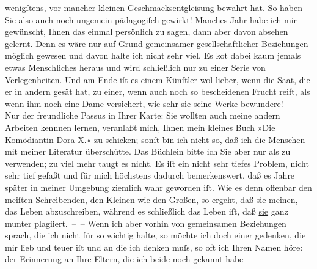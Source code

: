 \begin{ledgroupsized}[t]{13cm}
               wenigſtens, vor mancher kleinen Geschmacksentgleisung bewahrt hat. So haben Sie also
               auch noch ungemein pädagogiſch gewirkt!\pend
           \pstart
           {\pb}Manches Jahr habe ich mir gewünscht, Ihnen das einmal
               persönlich zu sagen, dann aber davon absehen gelernt. Denn es wäre nur auf Grund
               gemeinsamer gesellschaftlicher Beziehungen möglich gewesen und davon halte ich nicht
               sehr viel. Es ko{\geminationm}t dabei kaum jemals etwas Menschliches
               heraus und wird schließlich nur zu einer Serie von Verlegenheiten. Und am Ende iſt es
               einem Künſtler wol lieber, wenn die Saat, die er in andern gesät hat, zu einer, wenn
               auch noch so bescheidenen Frucht reift, als wenn ihm \uline{noch} eine Dame versichert, wie sehr sie seine Werke bewundere! – –\pend
           \pstart
           Nur der freundliche Passus in Ihrer Karte: Sie wollten auch meine andern Arbeiten
               kennnen lernen, veranlaßt mich, Ihnen mein kleines Buch »Die Komödiantin Dora X.« zu schicken; sonſt bin ich nicht so, daß ich die
               Menschen mit meiner Literatur überschütte. Das Büchlein bitte ich Sie\strikeout{,} aber nur als \label{K_L02572-1v}\label{K_L02572-1h} zu verwenden; zu viel mehr taugt es nicht. Es iſt ein nicht sehr tiefes
               Problem, nicht sehr tief gefaßt und für mich höchstens dadurch bemerkenswert, daß es
               Jahre später in meiner Umgebung ziemlich wahr geworden iſt. Wie es denn offenbar den
               meiſten Schreibenden, den Kleinen wie den Großen, so ergeht, {\pb}daß sie meinen, das Leben abzuschreiben, während es schließlich das Leben iſt, daß
                  \uline{sie} ganz munter plagiiert. – –\pend
           \pstart
           Wenn ich aber vorhin von gemeinsamen Beziehungen sprach, die ich nicht für so wichtig
               halte, so möchte ich doch einer gedenken, die mir lieb und teuer iſt und an die ich
               denken muſs, so oft ich Ihren Namen höre: der Erinnerung an Ihre Eltern, die ich beide noch gekannt habe

\end{ledgroupsized}
